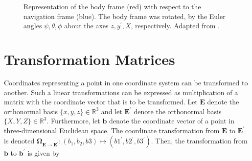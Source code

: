 \begin{figure}[ht]
\centering
{}
\caption{Representation of the body frame (red) with respect to the navigation frame (blue). The body frame was rotated, by the Euler angles $\psi, \theta, \phi$ about the axes $z, y^{'}, X$, respectively. Adapted from \cite{Wiki_taitbryan}.} \label{fig:Euler_angles}
\end{figure}

\section{Transformation Matrices}

Coordinates representing a point in one coordinate system can be transformed to another. Such a linear transformations can be expressed as multiplication of a matrix with the coordinate vector that is to be transformed. Let $\mathbf{E}$ denote the orthonormal basis $\{x, y, z\} \in \mathbb{R}^3$ and let $\mathbf{E}^{'}$ denote the orthonormal basis $\{X, Y, Z\} \in \mathbb{R}^3$. Furthermore, let $\mathbf{b}$ denote the coordinate vector of a point in three-dimensional Euclidean space. The coordinate transformation from $\mathbf{E}$ to $\mathbf{E}^{'}$ is denoted $\mathbf{\Omega}_{\mathbf{E} \rightarrow \mathbf{E}^{'}}: (b_1, b_2, b3) \mapsto (b1^{'}, b2^{'}, b3^{'})$. Then, the transformation from $\mathbf{b}$ to $\mathbf{b}^{'}$ is given by

